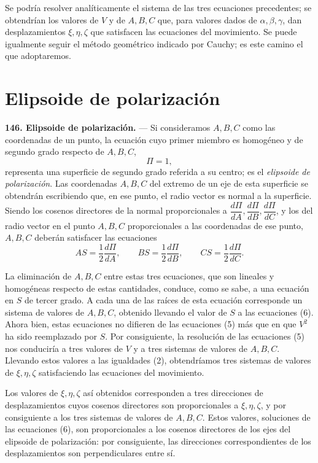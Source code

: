 Se podría resolver analíticamente el sistema de las tres ecuaciones
precedentes; se obtendrían los valores de $V$ y de $A,B,C$ que, para
valores dados de $\alpha,\beta,\gamma$, dan desplazamientos $\xi,\eta,\zeta$
que satisfacen las ecuaciones del movimiento. Se puede igualmente seguir
el método geométrico indicado por Cauchy; es este camino el que
adoptaremos.

\section{Elipsoide de polarización}

\noindent\textbf{146. Elipsoide de polarización.} — Si consideramos
$A,B,C$ como las coordenadas de un punto, la ecuación cuyo primer miembro
es homogéneo y de segundo grado respecto de $A,B,C$,
\[
\Pi=1,
\]
representa una superficie de segundo grado referida a su centro; es el
\emph{elipsoide de polarización}. Las coordenadas $A,B,C$ del extremo de un
eje de esta superficie se obtendrán escribiendo que, en ese punto, el
radio vector es normal a la superficie. Siendo los cosenos directores de
la normal proporcionales a $\dfrac{d\Pi}{dA},\dfrac{d\Pi}{dB},\dfrac{d\Pi}{dC}$,
y los del radio vector en el punto $A,B,C$ proporcionales a las
coordenadas de ese punto, $A,B,C$ deberán satisfacer las ecuaciones
\begin{equation}
AS=\frac{1}{2}\frac{d\Pi}{dA},\qquad
BS=\frac{1}{2}\frac{d\Pi}{dB},\qquad
CS=\frac{1}{2}\frac{d\Pi}{dC}.
\tag{6}
\end{equation}

La eliminación de $A,B,C$ entre estas tres ecuaciones, que son lineales y
homogéneas respecto de estas cantidades, conduce, como se sabe, a una
ecuación en $S$ de tercer grado. A cada una de las raíces de esta ecuación
corresponde un sistema de valores de $A,B,C$, obtenido llevando el valor
de $S$ a las ecuaciones (6). Ahora bien, estas ecuaciones no difieren de
las ecuaciones (5) más que en que $V^2$ ha sido reemplazado por
$S$. Por consiguiente, la
resolución de las ecuaciones (5) nos conduciría a tres valores de $V$ y a
tres sistemas de valores de $A,B,C$. Llevando estos valores a las
igualdades (2), obtendríamos tres sistemas de valores de $\xi,\eta,\zeta$
satisfaciendo las ecuaciones del movimiento.

Los valores de $\xi,\eta,\zeta$ así obtenidos corresponden a tres
direcciones de desplazamientos cuyos cosenos directores son
proporcionales a $\xi,\eta,\zeta$, y por consiguiente a los tres sistemas
de valores de $A,B,C$. Estos valores, soluciones de las ecuaciones (6),
son proporcionales a los cosenos directores de los ejes del elipsoide de
polarización: por consiguiente, las direcciones correspondientes de los
desplazamientos son perpendiculares entre sí.


